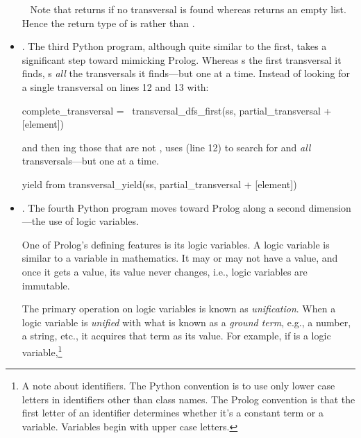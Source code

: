 \begin{sloppypar}
\begin{itemize}[label=$\bullet$]
~ Note that  returns  if no transversal is found whereas  returns an empty list. Hence the return type of  is  rather than . 
\smallv

\item  {}. 
The third Python program, although quite similar to the first, takes a significant step toward mimicking Prolog. Whereas  s the first transversal it finds,  s \textit{all} the transversals it finds---but one at a time.  Instead of looking for a single transversal on lines 12 and 13 with:
\begin{python}
complete_transversal =  \ 
  transversal_dfs_first(ss, partial_transversal + [element])
\end{python}
and then ing those that are not ,  uses  (line 12)   to search for and  \textit{all} transversals---but one at a time.
\begin{python}
yield from transversal_yield(ss, partial_transversal + [element])
\end{python}

\item  {}. The fourth Python program moves toward Prolog along a second dimension---the use of logic variables.
\smallv

One of Prolog's defining features is its logic variables. A logic variable is similar to a variable in mathematics. It may or may not have a value, and once it gets a value, its value never changes, i.e., logic variables are immutable.
\smallv

The primary operation on logic variables is known as \textit{unification}. When a logic variable is \textit{unified} with what is known as a \textit{ground term}, e.g., a number, a string, etc., it acquires that term as its value. For example, if  is a logic variable,\footnote{A note about identifiers. The Python convention is to use only lower case letters in identifiers other than class names. The Prolog convention is that the first letter of an identifier determines whether it's a constant term or a variable. Variables begin with upper case letters. 
\smallv
    
}
\end{itemize}
\end{sloppypar}
